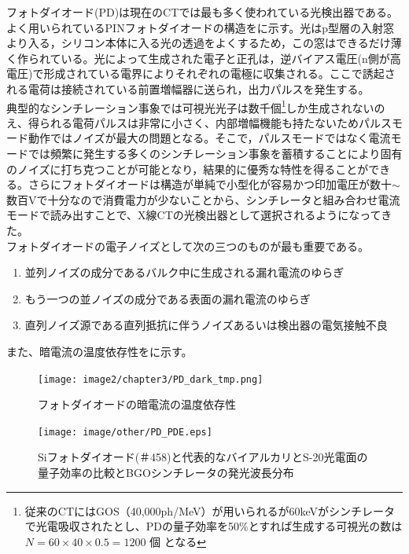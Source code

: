 フォトダイオード(PD)は現在のCTでは最も多く使われている光検出器である。よく用いられているPINフォトダイオードの構造をに示す。光はp型層の入射窓より入る，シリコン本体に入る光の透過をよくするため，この窓はできるだけ薄く作られている。光によって生成された電子と正孔は，逆バイアス電圧(n側が高電圧)で形成されている電界によりそれぞれの電極に収集される。ここで誘起される電荷は接続されている前置増幅器に送られ，出力パルスを発生する。\\
典型的なシンチレーション事象では可視光光子は数千個\footnote{従来のCTにはGOS（40,000ph/MeV）が用いられるが60keVがシンチレータで光電吸収されたとし、PDの量子効率を50\%とすれば生成する可視光の数は$N =60\times 40\times 0.5=1200$ 個
となる}しか生成されないのえ、得られる電荷パルスは非常に小さく、内部増幅機能も持たないためパルスモード動作ではノイズが最大の問題となる。そこで，パルスモードではなく電流モードでは頻繁に発生する多くのシンチレーション事象を蓄積することにより固有のノイズに打ち克つことが可能となり，結果的に優秀な特性を得ることができる。さらにフォトダイオードは構造が単純で小型化が容易かつ印加電圧が数十$\sim$数百Vで十分なので消費電力が少ないことから、シンチレータと組み合わせ電流モードで読み出すことで、X線CTの光検出器として選択されるようになってきた。\\
フォトダイオードの電子ノイズとして次の三つのものが最も重要である。
\begin{enumerate}
\item 並列ノイズの成分であるバルク中に生成される漏れ電流のゆらぎ
\item もう一つの並ノイズの成分である表面の漏れ電流のゆらぎ
\item 直列ノイズ源である直列抵抗に伴うノイズあるいは検出器の電気接触不良
\end{enumerate}
また、暗電流の温度依存性をに示す。




\begin{figure}[H]
 \begin{center}
 \texttt{[image: image2/chapter3/PD\_dark\_tmp.png]} 
 \end{center}
 \caption{フォトダイオードの暗電流の温度依存性}
 \label{fig:PD_darkcurrents}
\end{figure}



\begin{figure}[H]
 \begin{center}
 \texttt{[image: image/other/PD\_PDE.eps]}
 \end{center}
 \caption{Siフォトダイオード(＃458)と代表的なバイアルカリとS-20光電面の量子効率の比較とBGOシンチレータの発光波長分布\cite{radiation_handbook}}
 \label{fig:ryousi_PD}
\end{figure}


